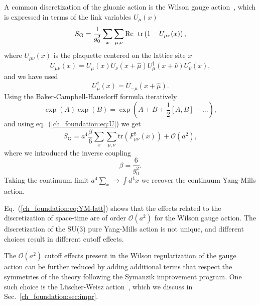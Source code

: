 A common discretization of the gluonic action is the Wilson gauge action~\citep{Wilson:1974sk}, which is expressed in terms of the link variables $U_{\mu}(x)$
\begin{equation}
\label{ch_foundation:eq:SG}
S_{\textrm{G}}=\frac{1}{g_0^2}\sum_x\sum_{\mu,\nu}{\textrm{Re\; tr}}\left(1-U_{\mu\nu}(x)\right),
\end{equation} 
where $U_{\mu\nu}(x)$ is the plaquette centered on the lattice site $x$
\begin{equation}
\label{ch_foundation:eq:plaq}
U_{\mu\nu}(x)=U_{\mu}(x)U_{\nu}(x+\hat{\mu})U_{\mu}^{\dagger}(x+\hat{\nu})U_{\nu}^{\dagger}(x),
\end{equation}
and we have used 
\begin{equation}
U_{\mu}^{\dagger}(x)=U_{-\mu}(x+\hat{\mu}).
\end{equation}
Using the Baker-Campbell-Hausdorff formula iteratively
\begin{equation}
\exp\left(A\right)\exp\left(B\right)=\exp\left(A+B+\frac{1}{2}\left[A,B\right]+...\right),
\end{equation}
and using eq.~(\ref{ch_foundation:eq:U}) we get
\begin{equation}
\label{ch_foundation:eq:YM-latt}
S_{\textrm{G}}=a^4\frac{\beta}{6}\sum_x\sum_{\mu,\nu}{\textrm{tr}}\left(F_{\mu\nu}^2(x)\right)+\mathcal{O}(a^2),
\end{equation}
where we introduced the inverse coupling
\begin{equation}
\beta=\frac{6}{g_0^2}.
\end{equation}
Taking the continuum limit $a^4\sum_x\rightarrow\int d^4x$ we recover the continuum Yang-Mills action.

Eq.~(\ref{ch_foundation:eq:YM-latt}) shows that the effects related to the discretization of space-time are of order $\mathcal{O}(a^2)$ for the Wilson gauge action. The discretization of the SU(3) pure Yang-Mills action is not unique, and different choices result in different cutoff effects.

The $\mathcal{O}(a^2)$ cutoff effects present in the Wilson regularization of the gauge action can be further reduced by adding additional terms that respect the symmetries of the theory following the Symanzik improvement program. One such choice is the Lüscher-Weisz action~\citep{Luscher:1984xn}, which we discuss in Sec.~\ref{ch_foundation:sec:impr}.



